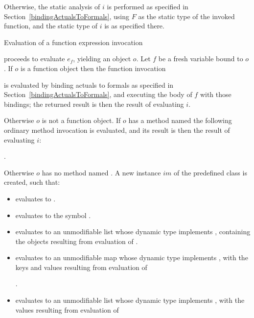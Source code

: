 \documentclass[makeidx]{article}
\begin{document}
{\LMHash{}%
Otherwise, the static analysis of $i$ is performed as specified
in Section~\ref{bindingActualsToFormals},
using $F$ as the static type of the invoked function,
and the static type of $i$ is as specified there.

\LMHash{}%
Evaluation of a function expression invocation

\noindent
{}

\noindent
proceeds to evaluate $e_f$, yielding an object $o$.
Let $f$ be a fresh variable bound to $o$.
If $o$ is a function object then the function invocation

\noindent
{}

\noindent
is evaluated by binding actuals to formals
as specified in Section~\ref{bindingActualsToFormals},
and executing the body of $f$ with those bindings;
the returned result is then the result of evaluating $i$.

\LMHash{}%
Otherwise $o$ is not a function object.
If $o$ has a method named \CALL{}
the following ordinary method invocation is evaluated,
and its result is then the result of evaluating $i$:

\noindent
{}.

\LMHash{}%
Otherwise $o$ has no method named \CALL.
A new instance $im$ of the predefined class  is created,
such that:
\begin{itemize}
\item {} evaluates to \TRUE.
\item {} evaluates to the symbol .
\item {} evaluates to an unmodifiable list
  whose dynamic type implements ,
  containing the objects resulting from evaluation of
  .
\item {} evaluates to an unmodifiable map
  whose dynamic type implements ,
  with the keys and values resulting from evaluation of

  .
\item {} evaluates to an unmodifiable list
  whose dynamic type implements ,
  with the values resulting from evaluation of


\end{itemize}}
\end{document}

